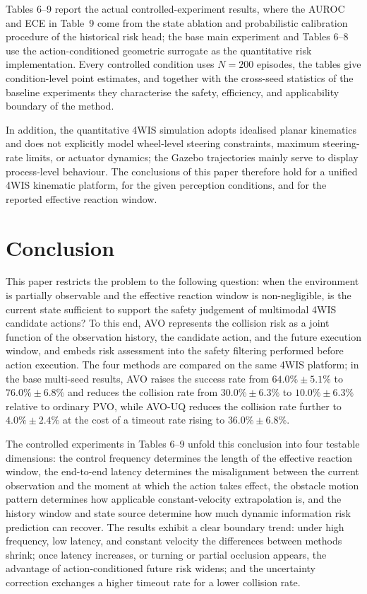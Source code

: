 \documentclass[10pt,a4paper,twocolumn]{article}
\begin{document}
Tables 6--9 report the actual controlled-experiment results, where the AUROC and ECE in Table~9 come from the state ablation and probabilistic calibration procedure of the historical risk head; the base main experiment and Tables 6--8 use the action-conditioned geometric surrogate as the quantitative risk implementation. Every controlled condition uses $N=200$ episodes, the tables give condition-level point estimates, and together with the cross-seed statistics of the baseline experiments they characterise the safety, efficiency, and applicability boundary of the method.

In addition, the quantitative 4WIS simulation adopts idealised planar kinematics and does not explicitly model wheel-level steering constraints, maximum steering-rate limits, or actuator dynamics; the Gazebo trajectories mainly serve to display process-level behaviour. The conclusions of this paper therefore hold for a unified 4WIS kinematic platform, for the given perception conditions, and for the reported effective reaction window.

\section{Conclusion}

This paper restricts the problem to the following question: when the environment is partially observable and the effective reaction window is non-negligible, is the current state sufficient to support the safety judgement of multimodal 4WIS candidate actions? To this end, AVO represents the collision risk as a joint function of the observation history, the candidate action, and the future execution window, and embeds risk assessment into the safety filtering performed before action execution. The four methods are compared on the same 4WIS platform; in the base multi-seed results, AVO raises the success rate from $64.0\%\pm5.1\%$ to $76.0\%\pm6.8\%$ and reduces the collision rate from $30.0\%\pm6.3\%$ to $10.0\%\pm6.3\%$ relative to ordinary PVO, while AVO-UQ reduces the collision rate further to $4.0\%\pm2.4\%$ at the cost of a timeout rate rising to $36.0\%\pm6.8\%$.

The controlled experiments in Tables 6--9 unfold this conclusion into four testable dimensions: the control frequency determines the length of the effective reaction window, the end-to-end latency determines the misalignment between the current observation and the moment at which the action takes effect, the obstacle motion pattern determines how applicable constant-velocity extrapolation is, and the history window and state source determine how much dynamic information risk prediction can recover. The results exhibit a clear boundary trend: under high frequency, low latency, and constant velocity the differences between methods shrink; once latency increases, or turning or partial occlusion appears, the advantage of action-conditioned future risk widens; and the uncertainty correction exchanges a higher timeout rate for a lower collision rate.



\end{document}
